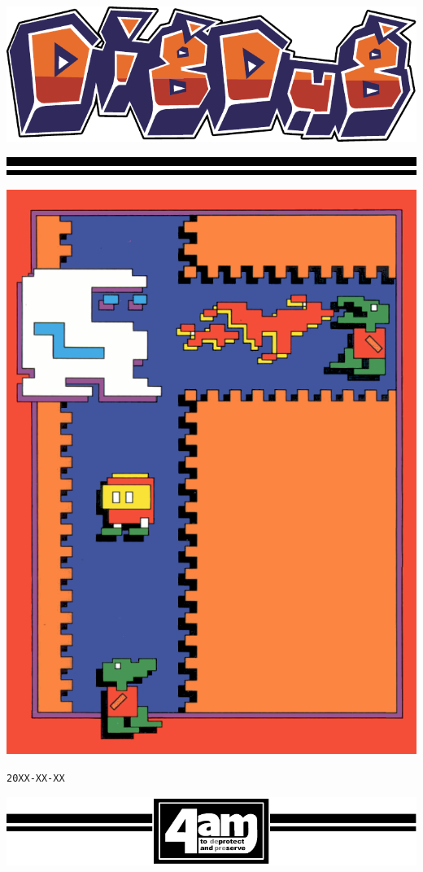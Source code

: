 \documentclass{article}
\begin{document}

\vspace*{\fill}

\centerline{\includegraphics[width=.9\textwidth]{logo}}

\vspace*{10pt}

\noindent
\includegraphics[width=\textwidth]{lines}

\vspace*{\fill}

\centerline{\includegraphics[width=.6\textwidth]{cover}}

\vspace*{\fill}

\centerline{\tt 20XX-XX-XX}

\noindent
\includegraphics[width=\textwidth]{footer}
\end{document}
